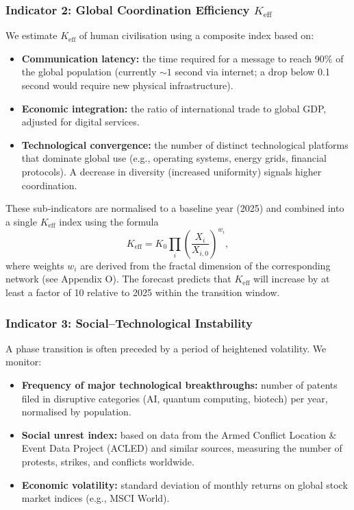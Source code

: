 \documentclass[12pt,a4paper]{article}
\theoremstyle{remark}
\begin{document}
	\subsubsection{Indicator 2: Global Coordination Efficiency \(K_{\text{eff}}\)}
	
	We estimate \(K_{\text{eff}}\) of human civilisation using a composite index based on:
	
	\begin{itemize}
		\item \textbf{Communication latency:} the time required for a message to reach 90\% of the global population (currently \(\sim 1\) second via internet; a drop below 0.1 second would require new physical infrastructure).
		\item \textbf{Economic integration:} the ratio of international trade to global GDP, adjusted for digital services.
		\item \textbf{Technological convergence:} the number of distinct technological platforms that dominate global use (e.g., operating systems, energy grids, financial protocols). A decrease in diversity (increased uniformity) signals higher coordination.
	\end{itemize}
	
	These sub‑indicators are normalised to a baseline year (2025) and combined into a single \(K_{\text{eff}}\) index using the formula
	\[
	K_{\text{eff}} = K_0 \prod_{i} \left(\frac{X_i}{X_{i,0}}\right)^{w_i},
	\]
	where weights \(w_i\) are derived from the fractal dimension of the corresponding network (see Appendix O). The forecast predicts that \(K_{\text{eff}}\) will increase by at least a factor of 10 relative to 2025 within the transition window.
	
	\subsubsection{Indicator 3: Social–Technological Instability}
	
	A phase transition is often preceded by a period of heightened volatility. We monitor:
	
	\begin{itemize}
		\item \textbf{Frequency of major technological breakthroughs:} number of patents filed in disruptive categories (AI, quantum computing, biotech) per year, normalised by population.
		\item \textbf{Social unrest index:} based on data from the Armed Conflict Location \& Event Data Project (ACLED) and similar sources, measuring the number of protests, strikes, and conflicts worldwide.
		\item \textbf{Economic volatility:} standard deviation of monthly returns on global stock market indices (e.g., MSCI World).
	\end{itemize}
	
\end{document}
